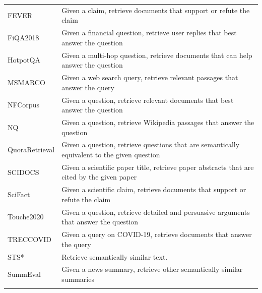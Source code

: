\documentclass{article}
\begin{document}
\begin{longtable}{lp{9cm}}
FEVER & Given a claim, retrieve documents that support or refute the claim \\
FiQA2018 & Given a financial question, retrieve user replies that best answer the question \\
HotpotQA & Given a multi-hop question, retrieve documents that can help answer the question \\
MSMARCO & Given a web search query, retrieve relevant passages that answer the query \\
NFCorpus & Given a question, retrieve relevant documents that best answer the question \\
NQ & Given a question, retrieve Wikipedia passages that answer the question \\
QuoraRetrieval & Given a question, retrieve questions that are semantically equivalent to the given question \\
SCIDOCS & Given a scientific paper title, retrieve paper abstracts that are cited by the given paper \\
SciFact & Given a scientific claim, retrieve documents that support or refute the claim \\
Touche2020 & Given a question, retrieve detailed and persuasive arguments that answer the question \\
TRECCOVID & Given a query on COVID-19, retrieve documents that answer the query \\
\midrule
STS* & Retrieve semantically similar text. \\
\midrule
SummEval & Given a news summary, retrieve other semantically similar summaries \\
\bottomrule
\label{tab:e5instructions}
\end{longtable}
\end{document}
